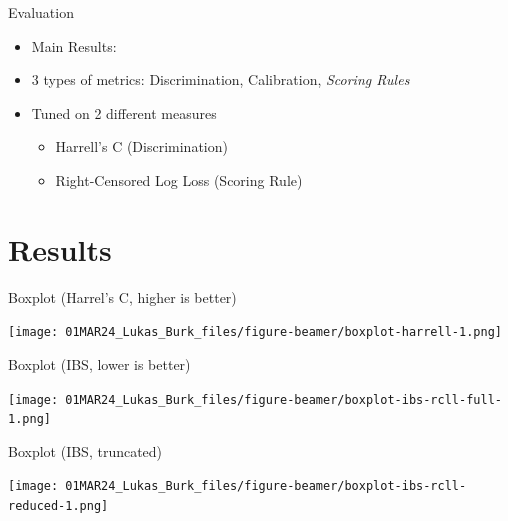 \documentclass[aspectratio=169,12pt]{beamer}
\providecommand{\tightlist}{%
  \setlength{\itemsep}{2pt}\setlength{\parskip}{0pt}}
\begin{document}
\begin{frame}{Evaluation}
\label{evaluation}
\begin{itemize}[<+->]
\tightlist
\item
  Main Results:

\item
  3 types of metrics: Discrimination, Calibration, \emph{Scoring Rules}
\item
  Tuned on 2 different measures

  \begin{itemize}[<+->]
  \tightlist
  \item
    Harrell's C (Discrimination)
  \item
    Right-Censored Log Loss (Scoring Rule)
  \end{itemize}
\end{itemize}
\end{frame}

\section{Results}\label{results}

\begin{frame}{Boxplot (Harrel's C, higher is better)}
\label{boxplot-harrels-c-higher-is-better}
\begin{center}
\texttt{[image: 01MAR24\_Lukas\_Burk\_files/figure-beamer/boxplot-harrell-1.png]}
\end{center}
\end{frame}

\begin{frame}{Boxplot (IBS, lower is better)}
\label{boxplot-ibs-lower-is-better}
\begin{center}
\texttt{[image: 01MAR24\_Lukas\_Burk\_files/figure-beamer/boxplot-ibs-rcll-full-1.png]}
\end{center}
\end{frame}

\begin{frame}{Boxplot (IBS, truncated)}
\label{boxplot-ibs-truncated}
\begin{center}
\texttt{[image: 01MAR24\_Lukas\_Burk\_files/figure-beamer/boxplot-ibs-rcll-reduced-1.png]}
\end{center}
\end{frame}
\end{document}

